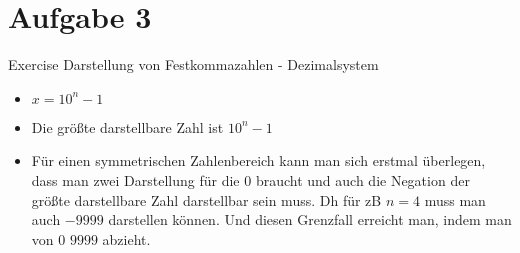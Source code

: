 
\section{Aufgabe 3}

\setcounter{exercise}{1}

\begin{frame}[allowframebreaks]{Exercise \thesection}{Darstellung von Festkommazahlen - Dezimalsystem}
  \begin{solution}
    \begin{itemize}
      \item $x=10^n-1$
      \item Die \alert{größte darstellbare Zahl} ist $10^n - 1$
      \item Für einen symmetrischen Zahlenbereich kann man sich erstmal überlegen, dass man zwei Darstellung für die $0$ braucht und auch die Negation der größte darstellbare Zahl darstellbar sein muss. Dh für zB $n = 4$ muss man auch $-9999$ darstellen können. Und diesen Grenzfall erreicht man, indem man von $0$ $9999$ abzieht.
    \end{itemize}
  \end{solution}
\end{frame}
